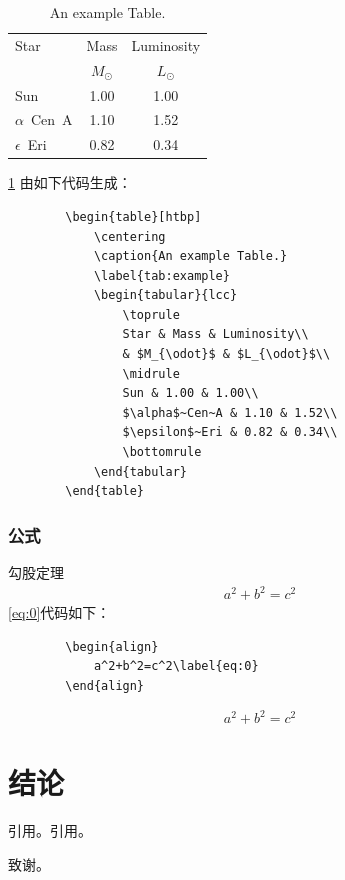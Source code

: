 \documentclass{YNUbachelor}
\begin{document}
	\begin{table}[htbp]
		\centering
		\caption{An example Table.}
		\label{tab:example}
		\begin{tabular}{lcc}
			\toprule
			Star & Mass & Luminosity\\
			& $M_{\odot}$ & $L_{\odot}$\\
			\midrule
			Sun & 1.00 & 1.00\\
			$\alpha$~Cen~A & 1.10 & 1.52\\
			$\epsilon$~Eri & 0.82 & 0.34\\
			\bottomrule
		\end{tabular}
	\end{table}
	\ref{tab:example} 由如下代码生成：
	\begin{verbatim}
		\begin{table}[htbp]
			\centering
			\caption{An example Table.}
			\label{tab:example}
			\begin{tabular}{lcc}
				\toprule
				Star & Mass & Luminosity\\
				& $M_{\odot}$ & $L_{\odot}$\\
				\midrule
				Sun & 1.00 & 1.00\\
				$\alpha$~Cen~A & 1.10 & 1.52\\
				$\epsilon$~Eri & 0.82 & 0.34\\
				\bottomrule
			\end{tabular}
		\end{table}
	\end{verbatim}

	\subsubsection{公式}
	
	勾股定理
	\begin{align}
		a^2+b^2=c^2\label{eq:0}
	\end{align}
	\ref{eq:0}代码如下：
	\begin{verbatim}
		\begin{align}
			a^2+b^2=c^2\label{eq:0}
		\end{align}
	\end{verbatim}

	\[
		a^2+b^2=c^2
	\]
	\section{结论}
	引用\cite{向守平2008天体物理概论}。引用\cite{BQC_2020}。
	\begin{acknowledgement}
		致谢。
	\end{acknowledgement}

	
	
	
	\backcover%
\end{document}
